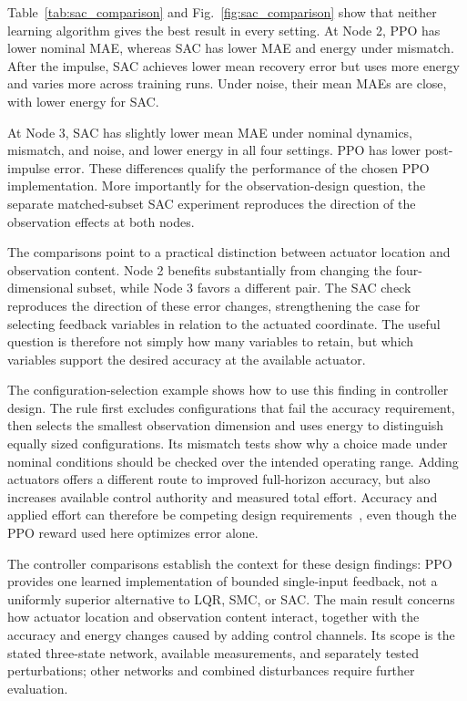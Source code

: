 \documentclass[a4paper,fleqn]{cas-dc}
\theoremstyle{plain}
\theoremstyle{definition}
\begin{document}
Table~\ref{tab:sac_comparison} and Fig.~\ref{fig:sac_comparison} show that neither learning algorithm gives the best result in every setting. At Node 2, PPO has lower nominal MAE, whereas SAC has lower MAE and energy under mismatch. After the impulse, SAC achieves lower mean recovery error but uses more energy and varies more across training runs. Under noise, their mean MAEs are close, with lower energy for SAC.

At Node 3, SAC has slightly lower mean MAE under nominal dynamics, mismatch, and noise, and lower energy in all four settings. PPO has lower post-impulse error. These differences qualify the performance of the chosen PPO implementation. More importantly for the observation-design question, the separate matched-subset SAC experiment reproduces the direction of the observation effects at both nodes.

The comparisons point to a practical distinction between actuator location and observation content. Node 2 benefits substantially from changing the four-dimensional subset, while Node 3 favors a different pair. The SAC check reproduces the direction of these error changes, strengthening the case for selecting feedback variables in relation to the actuated coordinate. The useful question is therefore not simply how many variables to retain, but which variables support the desired accuracy at the available actuator.

The configuration-selection example shows how to use this finding in controller design. The rule first excludes configurations that fail the accuracy requirement, then selects the smallest observation dimension and uses energy to distinguish equally sized configurations. Its mismatch tests show why a choice made under nominal conditions should be checked over the intended operating range. Adding actuators offers a different route to improved full-horizon accuracy, but also increases available control authority and measured total effort. Accuracy and applied effort can therefore be competing design requirements~\cite{rodriguez2020multiobjective}, even though the PPO reward used here optimizes error alone.

The controller comparisons establish the context for these design findings: PPO provides one learned implementation of bounded single-input feedback, not a uniformly superior alternative to LQR, SMC, or SAC. The main result concerns how actuator location and observation content interact, together with the accuracy and energy changes caused by adding control channels. Its scope is the stated three-state network, available measurements, and separately tested perturbations; other networks and combined disturbances require further evaluation.
\end{document}
